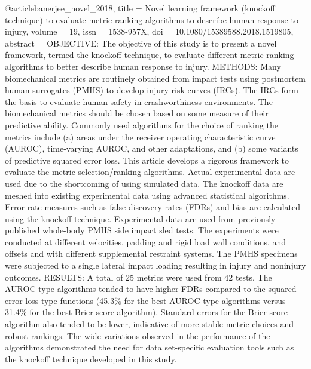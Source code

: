 @article{banerjee_novel_2018,
	title = {Novel learning framework (knockoff technique) to evaluate metric ranking algorithms to describe human response to injury},
	volume = {19},
	issn = {1538-957X},
	doi = {10.1080/15389588.2018.1519805},
	abstract = {OBJECTIVE: The objective of this study is to present a novel framework, termed the knockoff technique, to evaluate different metric ranking algorithms to better describe human response to injury.
METHODS: Many biomechanical metrics are routinely obtained from impact tests using postmortem human surrogates (PMHS) to develop injury risk curves (IRCs). The IRCs form the basis to evaluate human safety in crashworthiness environments. The biomechanical metrics should be chosen based on some measure of their predictive ability. Commonly used algorithms for the choice of ranking the metrics include (a) areas under the receiver operating characteristic curve (AUROC), time-varying AUROC, and other adaptations, and (b) some variants of predictive squared error loss. This article develops a rigorous framework to evaluate the metric selection/ranking algorithms. Actual experimental data are used due to the shortcoming of using simulated data. The knockoff data are meshed into existing experimental data using advanced statistical algorithms. Error rate measures such as false discovery rates (FDRs) and bias are calculated using the knockoff technique. Experimental data are used from previously published whole-body PMHS side impact sled tests. The experiments were conducted at different velocities, padding and rigid load wall conditions, and offsets and with different supplemental restraint systems. The PMHS specimens were subjected to a single lateral impact loading resulting in injury and noninjury outcomes.
RESULTS: A total of 25 metrics were used from 42 tests. The AUROC-type algorithms tended to have higher FDRs compared to the squared error loss-type functions (45.3\% for the best AUROC-type algorithms versus 31.4\% for the best Brier score algorithm). Standard errors for the Brier score algorithm also tended to be lower, indicative of more stable metric choices and robust rankings. The wide variations observed in the performance of the algorithms demonstrated the need for data set-specific evaluation tools such as the knockoff technique developed in this study.
}}
